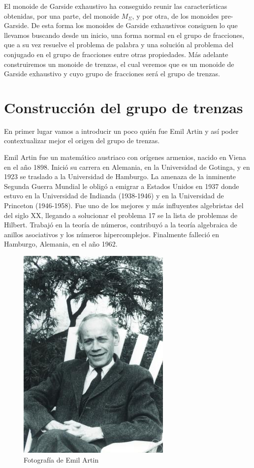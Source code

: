 \documentclass[12pt]{book}
\theoremstyle{definition}
\begin{document}
El monoide de Garside exhaustivo ha conseguido reunir las características obtenidas, por una parte, del monoide $M_\Sigma$, y por otra, de los monoides pre-Garside. De esta forma los monoides de Garside exhaustivos consiguen lo que llevamos buscando desde un inicio, una forma normal en el grupo de fracciones, que a su vez resuelve el problema de palabra y una solución al problema del conjugado en el grupo de fracciones entre otras propiedades.
Más adelante construiremos un monoide de trenzas, el cual veremos que es un monoide de Garside exhaustivo y cuyo grupo de fracciones será el grupo de trenzas.



\chapter{Construcción del grupo de trenzas}
\label{sec:cons_grtr}
En primer lugar vamos a introducir un poco quién fue Emil Artin y así poder contextualizar mejor el origen del grupo de trenzas. 

Emil Artin fue un matemático austriaco con orígenes armenios, nacido en Viena en el año 1898. Inició su carrera en Alemania, en la Universidad de Gotinga, y en 1923 se traslado a la Universidad de Hamburgo. La amenaza de la inminente Segunda Guerra Mundial le obligó a emigrar a Estados Unidos en 1937 donde estuvo en la Universidad de Indianda (1938-1946) y en la Universidad de Princeton (1946-1958). Fue uno de los mejores y más influyentes algebristas del del siglo XX, llegando a solucionar el problema 17 se la lista de problemas de Hilbert. Trabajó en la teoría de números, contribuyó a la teoría algebraica de anillos asociativos y los números hipercomplejos. Finalmente falleció en Hamburgo, Alemania, en el año 1962.

\begin{figure}[h!]
\centering
\includegraphics[scale=0.46]{imgs/EmilArtin.jpg} 
\caption{Fotografía de Emil Artin \cite{Emil}}
\label{img:pi_inverse}
\end{figure}
\end{document}

